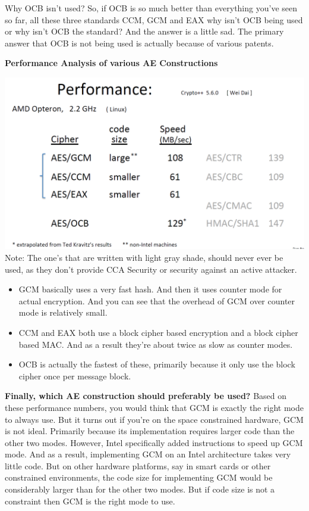 \documentclass[11pt]{article}
\makeatletter
\def\maxwidth{\ifdim\Gin@nat@width>\linewidth\linewidth
    \else\Gin@nat@width\fi}
\let\Oldincludegraphics\includegraphics
\renewcommand{\includegraphics}[1]{\Oldincludegraphics[width=.8\maxwidth]{#1}}
\providecommand{\tightlist}{%
      \setlength{\itemsep}{0pt}\setlength{\parskip}{0pt}}
\makeatother
\begin{document}
Why OCB isn't used? So, if OCB is so much better than everything you've
seen so far, all these three standards CCM, GCM and EAX why isn't OCB
being used or why isn't OCB the standard? And the answer is a little
sad. The primary answer that OCB is not being used is actually because
of various patents.

\textbf{Performance Analysis of various AE Constructions}

\includegraphics{./Images/AE-ConstructionsPerformance.png} Note: The
one's that are written with light gray shade, should never ever be used,
as they don't provide CCA Security or security against an active
attacker.

\begin{itemize}
\tightlist
\item
  GCM basically uses a very fast hash. And then it uses counter mode for
  actual encryption. And you can see that the overhead of GCM over
  counter mode is relatively small.
\item
  CCM and EAX both use a block cipher based encryption and a block
  cipher based MAC. And as a result they're about twice as slow as
  counter modes.
\item
  OCB is actually the fastest of these, primarily because it only use
  the block cipher once per message block.
\end{itemize}

\textbf{Finally, which AE construction should preferably be used?} Based
on these performance numbers, you would think that GCM is exactly the
right mode to always use. But it turns out if you're on the space
constrained hardware, GCM is not ideal. Primarily because its
implementation requires larger code than the other two modes. However,
Intel specifically added instructions to speed up GCM mode. And as a
result, implementing GCM on an Intel architecture takes very little
code. But on other hardware platforms, say in smart cards or other
constrained environments, the code size for implementing GCM would be
considerably larger than for the other two modes. But if code size is
not a constraint then GCM is the right mode to use.
\end{document}
